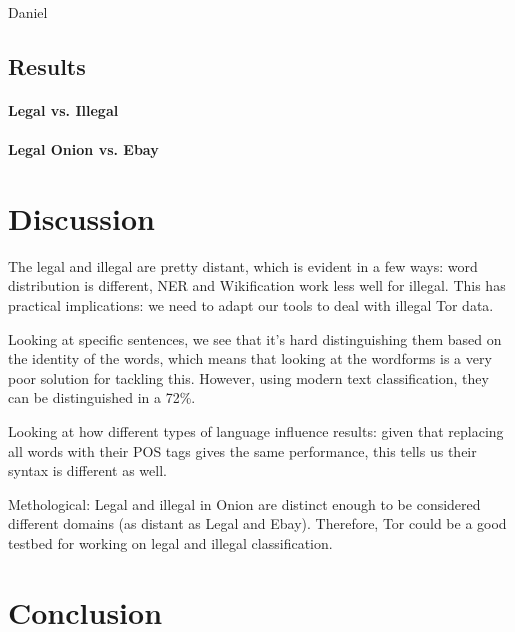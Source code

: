 \documentclass[11pt,a4paper]{article}
\begin{document}
Daniel

\subsection{Results}

\paragraph{Legal vs. Illegal}

\paragraph{Legal Onion vs. Ebay}


\section{Discussion}

The legal and illegal are pretty distant, which is evident in a few ways: word distribution is different, NER and Wikification work less well
for illegal. This has practical implications: we need to adapt our tools to deal with illegal Tor data. 

Looking at specific sentences, we see that it's hard distinguishing them based on the identity of the words, which means that
looking at the wordforms is a very poor solution for tackling this. However, using modern text classification, they can be distinguished
in a 72\%. 

Looking at how different types of language influence results: given that replacing all words with their POS tags gives
the same performance, this tells us their syntax is different as well.

Methological: Legal and illegal in Onion are distinct enough to be considered different domains (as distant as Legal and Ebay). 
Therefore, Tor could be a good testbed for working on legal and illegal classification.


\section{Conclusion}
 














\end{document}
